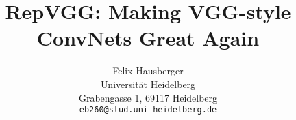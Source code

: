 \documentclass[final]{cvpr}
\begin{document}
\title{RepVGG: Making VGG-style ConvNets Great Again}

\author{Felix Hausberger\\
	Universität Heidelberg\\
	Grabengasse 1, 69117 Heidelberg\\
	{\tt\small eb260@stud.uni-heidelberg.de}
}

\maketitle

\begin{abstract}
	
\end{abstract}



















{\small


}
\end{document}
